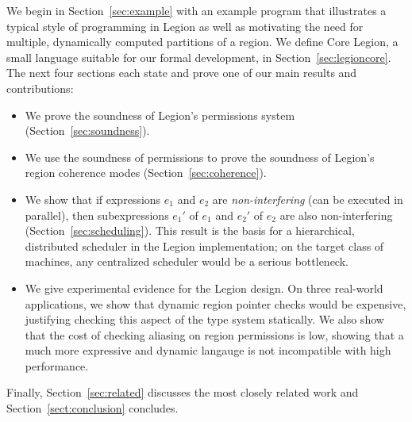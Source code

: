 We begin in Section~\ref{sec:example} with an example program that illustrates
a typical style of programming in Legion as well as motivating the need for multiple, dynamically computed  partitions of
a region.  We define Core Legion, a small language suitable for our formal development, in Section~\ref{sec:legioncore}.
The next four sections each state and prove one of our main results and contributions:
\begin{itemize}
\item We prove the soundness of Legion's permissions system (Section~\ref{sec:soundness}).

\item We use the soundness of permissions to prove the soundness of Legion's region coherence modes (Section~\ref{sec:coherence}).

\item We show that if expressions $e_1$ and $e_2$ are {\em non-interfering} (can be executed in parallel), then subexpressions
$e_1'$ of $e_1$ and $e_2'$ of $e_2$ are also non-interfering (Section~\ref{sec:scheduling}).  This result is the basis
for a hierarchical, distributed scheduler in the Legion implementation; on the target class of machines, any centralized
scheduler would be a serious bottleneck.

\item We give experimental evidence for the Legion design.  On three real-world applications, we show that 
dynamic region pointer checks would be expensive, justifying checking this aspect of the type system statically.
We also show that the cost of checking aliasing on region permissions is low, showing that a much more expressive
and dynamic langauge is not incompatible with high performance.

\end{itemize}
Finally, Section~\ref{sec:related} discusses the most closely related work and
Section~\ref{sect:conclusion} concludes.


  










